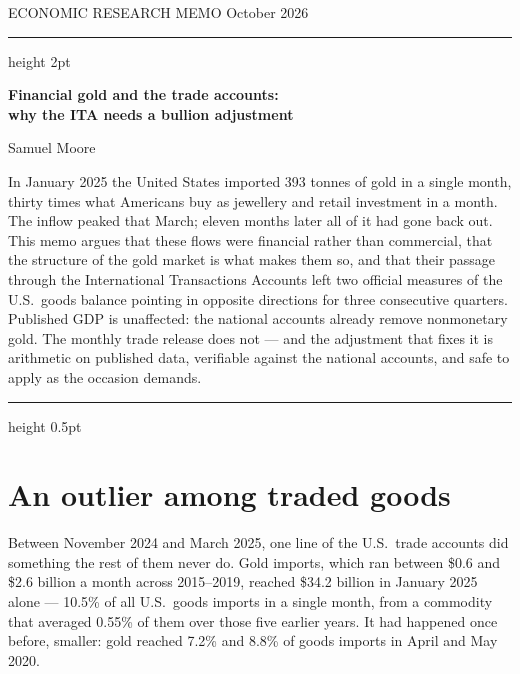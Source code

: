 \documentclass[11pt]{article}
\begin{document}
\pagestyle{empty}

{\sffamily\footnotesize\color{soft} ECONOMIC RESEARCH MEMO \hfill October 2026}

\vspace{4pt}
{\color{rule}\hrule height 2pt}
\vspace{10pt}

{\sffamily\bfseries\LARGE\color{ink}
Financial gold and the trade accounts:\\ why the ITA needs a bullion adjustment\par}

\vspace{6pt}
{\sffamily\small\color{soft} Samuel Moore\par}

\vspace{10pt}

{\sffamily\small\color{ink}
In January 2025 the United States imported 393 tonnes of gold in a single
month, thirty times what Americans buy as jewellery and retail investment in a
month. The inflow peaked that March; eleven months later all of it had gone
back out. This memo argues that
these flows were financial rather than commercial, that the structure of the
gold market is what makes them so, and that their passage through the
International Transactions Accounts left two official measures of the U.S.\
goods balance pointing in opposite directions for three consecutive quarters.
Published GDP is unaffected: the national accounts already remove nonmonetary
gold. The monthly trade release does not --- and the adjustment that fixes it
is arithmetic on published data, verifiable against the national accounts, and
safe to apply as the occasion demands.\par}

\vspace{6pt}
{\color{rule}\hrule height 0.5pt}

\section{An outlier among traded goods}

Between November 2024 and March 2025, one line of the U.S.\ trade accounts did
something the rest of them never do. Gold imports, which ran between \$0.6 and
\$2.6 billion a month across 2015--2019, reached \$34.2 billion in January 2025
alone --- 10.5\% of all U.S.\ goods imports in a single month, from a commodity
that averaged 0.55\% of them over those five earlier years. It had happened
once before, smaller: gold reached 7.2\% and 8.8\% of goods imports in April
and May 2020.
\end{document}
